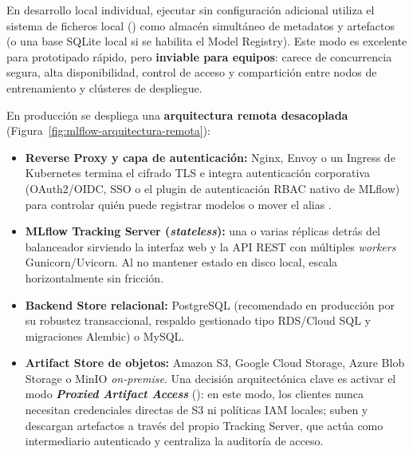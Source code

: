 En desarrollo local individual, ejecutar  sin configuración adicional utiliza el sistema de ficheros local () como almacén simultáneo de metadatos y artefactos (o una base SQLite local  si se habilita el Model Registry). Este modo es excelente para prototipado rápido, pero \textbf{inviable para equipos}: carece de concurrencia segura, alta disponibilidad, control de acceso y compartición entre nodos de entrenamiento y clústeres de despliegue.

En producción se despliega una \textbf{arquitectura remota desacoplada} (Figura~\ref{fig:mlflow-arquitectura-remota}):
\begin{itemize}
  \item \textbf{Reverse Proxy y capa de autenticación:} Nginx, Envoy o un Ingress de Kubernetes termina el cifrado TLS e integra autenticación corporativa (OAuth2/OIDC, SSO o el plugin de autenticación RBAC nativo de MLflow) para controlar quién puede registrar modelos o mover el alias .
  \item \textbf{MLflow Tracking Server (\textit{stateless}):} una o varias réplicas detrás del balanceador sirviendo la interfaz web y la API REST con múltiples \textit{workers} Gunicorn/Uvicorn. Al no mantener estado en disco local, escala horizontalmente sin fricción.
  \item \textbf{Backend Store relacional:} PostgreSQL (recomendado en producción por su robustez transaccional, respaldo gestionado tipo RDS/Cloud SQL y migraciones Alembic) o MySQL.
  \item \textbf{Artifact Store de objetos:} Amazon S3, Google Cloud Storage, Azure Blob Storage o MinIO \textit{on-premise}. Una decisión arquitectónica clave es activar el modo \textbf{\textit{Proxied Artifact Access}} (): en este modo, los clientes nunca necesitan credenciales directas de S3 ni políticas IAM locales; suben y descargan artefactos a través del propio Tracking Server, que actúa como intermediario autenticado y centraliza la auditoría de acceso.
\end{itemize}

